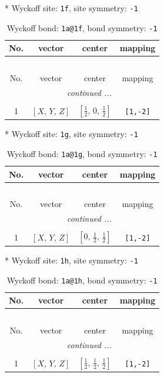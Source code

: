 \documentclass[fleqn,8pt]{jsarticle}
\begin{document}
* Wyckoff site: {\tt 1f}, site symmetry: {\tt -1}
\renewcommand{\arraystretch}{1.2}
\begin{longtable}{cccc}
\caption{Wyckoff bond: {\tt 1a@1f}, bond symmetry: {\tt -1}}
 \\
 \hline \hline
No. & vector & center & mapping \\ \hline \endfirsthead

\multicolumn{3}{l}{\tablename\ \thetable{}} \\
 \hline \hline
No. & vector & center & mapping \\ \hline \endhead

 \hline \hline
\multicolumn{3}{r}{\footnotesize\it continued ...} \\ \endfoot

 \hline \hline
\multicolumn{3}{r}{} \\ \endlastfoot

1 & $\left[ X,\, Y,\, Z \right]$ & $\left[ \frac{1}{2},\, 0,\, \frac{1}{2} \right]$ & {\tt [1,-2]} \\
\end{longtable}
* Wyckoff site: {\tt 1g}, site symmetry: {\tt -1}
\renewcommand{\arraystretch}{1.2}
\begin{longtable}{cccc}
\caption{Wyckoff bond: {\tt 1a@1g}, bond symmetry: {\tt -1}}
 \\
 \hline \hline
No. & vector & center & mapping \\ \hline \endfirsthead

\multicolumn{3}{l}{\tablename\ \thetable{}} \\
 \hline \hline
No. & vector & center & mapping \\ \hline \endhead

 \hline \hline
\multicolumn{3}{r}{\footnotesize\it continued ...} \\ \endfoot

 \hline \hline
\multicolumn{3}{r}{} \\ \endlastfoot

1 & $\left[ X,\, Y,\, Z \right]$ & $\left[ 0,\, \frac{1}{2},\, \frac{1}{2} \right]$ & {\tt [1,-2]} \\
\end{longtable}
* Wyckoff site: {\tt 1h}, site symmetry: {\tt -1}
\renewcommand{\arraystretch}{1.2}
\begin{longtable}{cccc}
\caption{Wyckoff bond: {\tt 1a@1h}, bond symmetry: {\tt -1}}
 \\
 \hline \hline
No. & vector & center & mapping \\ \hline \endfirsthead

\multicolumn{3}{l}{\tablename\ \thetable{}} \\
 \hline \hline
No. & vector & center & mapping \\ \hline \endhead

 \hline \hline
\multicolumn{3}{r}{\footnotesize\it continued ...} \\ \endfoot

 \hline \hline
\multicolumn{3}{r}{} \\ \endlastfoot

1 & $\left[ X,\, Y,\, Z \right]$ & $\left[ \frac{1}{2},\, \frac{1}{2},\, \frac{1}{2} \right]$ & {\tt [1,-2]} \\
\end{longtable}
\end{document}
